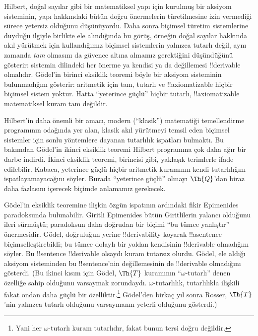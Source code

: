 \documentclass[../../../include/open-logic-section]{subfiles}
\begin{document}


Hilbert, doğal sayılar gibi bir matematiksel yapı için kurulmuş bir aksiyom
sisteminin, yapı hakkındaki bütün doğru önermelerin türetilmesine izin
vermediği sürece yetersiz olduğunu düşünüyordu. Daha sonra biçimsel türetim
sistemlerine duyduğu ilgiyle birlikte ele alındığında bu görüş, örneğin doğal
sayılar hakkında akıl yürütmek için kullandığımız biçimsel sistemlerin yalnızca
tutarlı değil, aynı zamanda \emph{tam} olmasını da güvence altına almamız
gerektiğini düşündüğünü gösterir: sistemin dilindeki her önerme ya kendisi ya
da değillemesi !!{derivable} olmalıdır. G\"odel'in birinci eksiklik teoremi
böyle bir aksiyom sisteminin bulunmadığını gösterir: aritmetik için tam,
tutarlı ve !!{axiomatizable} hiçbir biçimsel sistem yoktur. Hatta ``yeterince
güçlü'' hiçbir tutarlı, !!{axiomatizable} matematiksel kuram tam değildir.

Hilbert'in daha önemli bir amacı, modern (``klasik'') matematiği temellendirme
programının odağında yer alan, klasik akıl yürütmeyi temsil eden biçimsel
sistemler için sonlu yöntemlere dayanan tutarlılık ispatları bulmaktı. Bu
bakımdan G\"odel'in ikinci eksiklik teoremi Hilbert programına çok daha ağır
bir darbe indirdi. İkinci eksiklik teoremi, birincisi gibi, yaklaşık terimlerle
ifade edilebilir. Kabaca, yeterince güçlü hiçbir aritmetik kuramının kendi
tutarlılığını ispatlayamayacağını söyler. Burada ``yeterince güçlü'' olmayı
$\Th{Q}$'dan biraz daha fazlasını içerecek biçimde anlamamız gerekecek.

G\"odel'in eksiklik teoremine ilişkin özgün ispatının ardındaki fikir
Epimenides paradoksunda bulunabilir. Giritli Epimenides bütün Giritlilerin
yalancı olduğunu ileri sürmüştü; paradoksun daha doğrudan bir biçimi ``bu
tümce yanlıştır'' önermesidir. G\"odel, doğruluğun yerine !!{derivability}
koyarak !!a{sentence} biçimselleştirebildi; bu tümce dolaylı bir yoldan
kendisinin !!{derivable} olmadığını söyler. Bu !!{sentence} !!{derivable} olsaydı
kuram tutarsız olurdu. G\"odel, ele aldığı aksiyom sisteminden bu
!!{sentence}'nin değillemesinin de !!{derivable} olmadığını gösterdi. (Bu
ikinci kısım için G\"odel, $\Th{T}$ kuramının ``$\omega$-tutarlı'' denen
özelliğe sahip olduğunu varsaymak zorundaydı. $\omega$-tutarlılık,
tutarlılıkla ilişkili fakat ondan daha güçlü bir özelliktir.\footnote{Yani her
$\omega$-tutarlı kuram tutarlıdır, fakat bunun tersi doğru değildir.}
G\"odel'den birkaç yıl sonra Rosser, $\Th{T}$'nin yalnızca tutarlı olduğunu
varsaymanın yeterli olduğunu gösterdi.)
\end{document}

